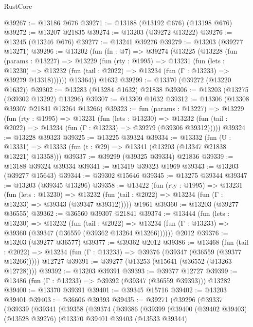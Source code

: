 \begin{lexlean}{RustCore}
\begin{coremodule}
@39267 := @13186 @676
@39271 := @13188 (@13192 @676) (@13198 @676)
@39272 := @13207 @21835
@39274 := @13203 (@39272 @13222)
@39276 := @13245 (@13246 @676)
@39277 := @13241 @39276
@39279 := @13203 (@39277 @13271)
@39296 := @13202
    (fun (fn : @7) =>
    @39274
      (@13225
        (@13228
          (fun (params : @13227) =>
          @13229
            (fun (rty : @1995) =>
            @13231
              (fun (lets : @13230) =>
              @13232 (fun (tail : @2022) => @13234 (fun (Γ : @13233) => @39279 @13318))))))
        @13364))
    @1632
@39299 := @13370 (@39272 (@13220 @1632))
@39302 := @13283 (@13284 @1632) @21838
@39306 := @13203 (@13275 (@39302 @13292) @13296)
@39307 := @13309 @1632
@39312 := @13306 (@13308 @39307 @21841 @13264 @13266)
@39323 := fun (params : @13227) =>
  @13229
    (fun (rty : @1995) =>
    @13231
      (fun (lets : @13230) =>
      @13232 (fun (tail : @2022) => @13234 (fun (Γ : @13233) => @39279 (@39306 @39312)))))
@39324 := @13228 @39323
@39325 := @13225 @39324
@39334 := @13332
    (fun (U : @13331) => @13333 (fun (t : @29) => @13341 (@13203 (@13347 @21838 @13221) @13358)))
@39337 := @39299 (@39325 @39334) @21836
@39339 := @13188 @39324 @39334
@39341 := @13419 @39323 @1969
@39343 := @13203 (@39277 @15643)
@39344 := @39302 @15646
@39345 := @13275 @39344
@39347 := @13203 (@39345 @13296)
@39358 := @13422
    (fun (rty : @1995) =>
    @13231
      (fun (lets : @13230) =>
      @13232 (fun (tail : @2022) => @13234 (fun (Γ : @13233) => @39343 (@39347 @39312)))))
    @1961
@39360 := @13203 (@39277 @36555)
@39362 := @36560 @39307 @21841
@39374 := @13444
    (fun (lets : @13230) =>
    @13232
      (fun (tail : @2022) =>
      @13234 (fun (Γ : @13233) => @39360 (@39347 (@36559 (@39362 @13264 @13266))))))
    @2012
@39376 := @13203 (@39277 @36577)
@39377 := @39362 @2012
@39386 := @13468
    (fun (tail : @2022) => @13234 (fun (Γ : @13233) => @39376 (@39347 (@36559 (@39377 @13266)))))
    @12727
@39391 := @39277 (@13253 (@15641 (@36552 (@13263 @12728))))
@39392 := @13203 @39391
@39393 := @39377 @12727
@39399 := @13486 (fun (Γ : @13233) => @39392 (@39347 (@36559 @39393))) @13282
@39400 := @13370 @39391
@39401 := @39345 @15716
@39402 := @13203 @39401
@39403 := @36606 @39393
@39435 := @39271
    (@39296
      (@39337
        (@39339
          (@39341
            (@39358
              (@39374
                (@39386
                  (@39399
                    (@39400
                      (@39402 @39403)
                      (@13528 @39276)
                      (@13370
                        @39401
                        @39403
                        (@13533 @39344)

\end{coremodule}
\end{lexlean}
